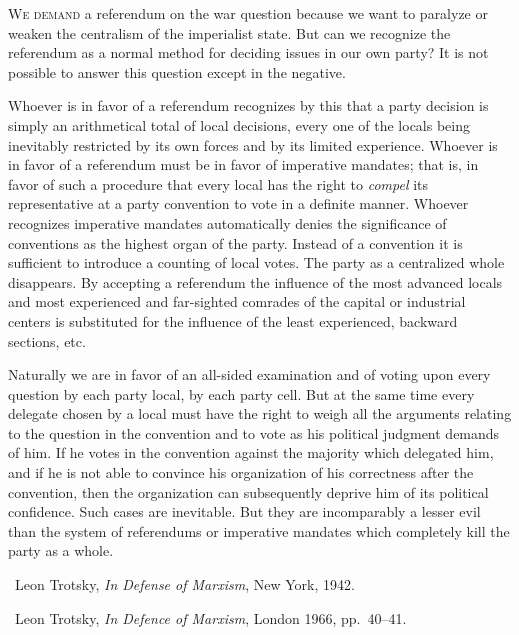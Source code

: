 
\noindent
\textsc{We demand} a referendum on the war question because we want to paralyze or weaken the centralism of the imperialist state. But can we recognize the referendum as a normal method for deciding issues in our own party? It is not possible to answer this question except in the negative.

Whoever is in favor of a referendum recognizes by this that a party decision is simply an arithmetical total of local decisions, every one of the locals being inevitably restricted by its own forces and by its limited experience. Whoever is in favor of a referendum must be in favor of imperative mandates; that is, in favor of such a procedure that every local has the right to \emph{compel} its representative at a party convention to vote in a definite manner. Whoever recognizes imperative mandates automatically denies the significance of conventions as the highest organ of the party. Instead of a convention it is sufficient to introduce a counting of local votes. The party as a centralized whole disappears. By accepting a referendum the influence of the most advanced locals and most experienced and far-sighted comrades of the capital or industrial centers is substituted for the influence of the least experienced, backward sections, etc.

Naturally we are in favor of an all-sided examination and of voting upon every question by each party local, by each party cell. But at the same time every delegate chosen by a local must have the right to weigh all the arguments relating to the question in the convention and to vote as his political judgment demands of him. If he votes in the convention against the majority which delegated him, and if he is not able to convince his organization of his correctness after the convention, then the organization can subsequently deprive him of its political confidence. Such cases are inevitable. But they are incomparably a lesser evil than the system of referendums or imperative mandates which completely kill the party as a whole.


\begin{letterinfo}
	\firstpublished\ Leon Trotsky, \emph{In Defense of Marxism}, New York, 1942.
	
	\checkedagainst\ Leon Trotsky, \emph{In Defence of Marxism}, London 1966, pp.~40--41.
	
	\footnoteslatter
\end{letterinfo}